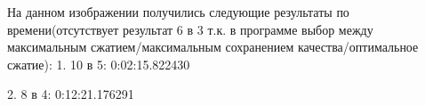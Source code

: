 \documentclass{article}
\begin{document}
На данном изображении получились следующие результаты по времени(отсутствует результат 6 в 3 т.к. в программе выбор между максимальным сжатием/максимальным сохранением качества/оптимальное сжатие):
1. 10 в 5: 0:02:15.822430

2. 8 в 4: 0:12:21.176291

\begin{figure}[h]
	\hfill
	\hfill
	\hfill
\end{figure}

  
\end{document}
